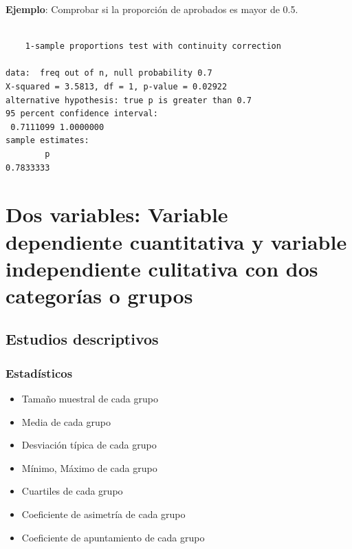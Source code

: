 \documentclass[
  a4paper,
]{scrreport}
\newenvironment{Shaded}{\begin{snugshade}}{\end{snugshade}}
\newcommand{\AttributeTok}[1]{\textcolor[rgb]{0.40,0.45,0.13}{#1}}
\newcommand{\FloatTok}[1]{\textcolor[rgb]{0.68,0.00,0.00}{#1}}
\newcommand{\FunctionTok}[1]{\textcolor[rgb]{0.28,0.35,0.67}{#1}}
\newcommand{\NormalTok}[1]{\textcolor[rgb]{0.00,0.23,0.31}{#1}}
\newcommand{\OtherTok}[1]{\textcolor[rgb]{0.00,0.23,0.31}{#1}}
\newcommand{\SpecialCharTok}[1]{\textcolor[rgb]{0.37,0.37,0.37}{#1}}
\newcommand{\StringTok}[1]{\textcolor[rgb]{0.13,0.47,0.30}{#1}}
\providecommand{\tightlist}{%
  \setlength{\itemsep}{0pt}\setlength{\parskip}{0pt}}\usepackage{longtable,booktabs,array}
\theoremstyle{definition}
\theoremstyle{definition}
\theoremstyle{remark}
\begin{document}
\textbf{Ejemplo}: Comprobar si la proporción de aprobados es mayor de
0.5.

\begin{Shaded}
\end{Shaded}

\begin{verbatim}

    1-sample proportions test with continuity correction

data:  freq out of n, null probability 0.7
X-squared = 3.5813, df = 1, p-value = 0.02922
alternative hypothesis: true p is greater than 0.7
95 percent confidence interval:
 0.7111099 1.0000000
sample estimates:
        p 
0.7833333 
\end{verbatim}

\section{Dos variables: Variable dependiente cuantitativa y variable
independiente culitativa con dos categorías o
grupos}\label{dos-variables-variable-dependiente-cuantitativa-y-variable-independiente-culitativa-con-dos-categoruxedas-o-grupos}

\subsection{Estudios descriptivos}\label{estudios-descriptivos-2}

\subsubsection{Estadísticos}\label{estaduxedsticos-2}

\begin{itemize}
\tightlist
\item
  Tamaño muestral de cada grupo
\item
  Media de cada grupo
\item
  Desviación típica de cada grupo
\item
  Mínimo, Máximo de cada grupo
\item
  Cuartiles de cada grupo
\item
  Coeficiente de asimetría de cada grupo
\item
  Coeficiente de apuntamiento de cada grupo
\end{itemize}
\end{document}
